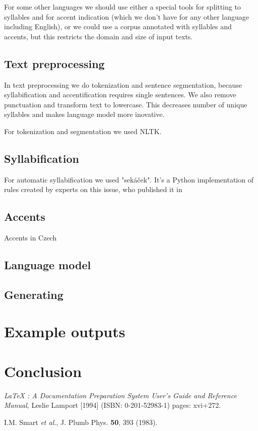 \documentclass[a4]{article}
\begin{document}
For some other languages we should use either a special tools for splitting
to syllables and for accent indication (which we don't have for any other
language including English),
or we could use a corpus annotated with syllables and accents, but this
restricts the domain and size of input texts.


\subsection{Text preprocessing}

In text preprocessing we do tokenization and sentence segmentation, because
syllabification and accentification requires single sentences. We also
remove punctuation and transform text to lowercase. This decreases number of
unique syllables and makes language model more inovative.

For tokenization and segmentation we used NLTK. %

\subsection{Syllabification}

For automatic syllabification we used "sekáček". %
It's a Python implementation of rules created by experts on this issue, who
published it in %

\subsection{Accents}

Accents in Czech 

\subsection{Language model}

\subsection{Generating}

\section{Example outputs}

\section{Conclusion}


\begin{thebibliography}{99}

 {\sl LaTeX : A Documentation Preparation System User's Guide and Reference Manual}, Leslie Lamport [1994] (ISBN: 0-201-52983-1) pages: xvi+272.

I.M. Smart {\it et al.}, J. Plumb Phys. {\bf 50}, 393 (1983).

\end{thebibliography}



\end{document}
